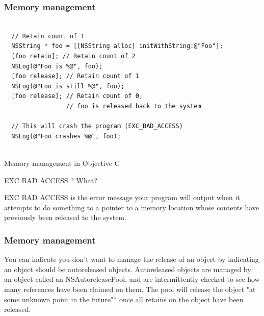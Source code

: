 \documentclass[10pt]{beamer}
\begin{document}
\begin{frame}[fragile]
  \frametitle{Memory management}
  \begin{listing}[H]
    \begin{verbatim}
  
  // Retain count of 1
  NSString * foo = [[NSString alloc] initWithString:@"Foo"];
  [foo retain]; // Retain count of 2
  NSLog(@"Foo is %@", foo);
  [foo release]; // Retain count of 1
  NSLog(@"Foo is still %@", foo);
  [foo release]; // Retain count of 0,
                 // foo is released back to the system
  
  // This will crash the program (EXC_BAD_ACCESS)
  NSLog(@"Foo crashes %@", foo);
              
  \end{verbatim}
    \caption{Memory management in Objective C}
    \label{listing:9}
  \end{listing}
\begin{block}{EXC BAD ACCESS ? What?}
  
  EXC BAD ACCESS is the error message your program will output when
  it attempts to do something to a pointer to a memory location
  whose contents have previously been released to the system.
              
  \end{block}

\end{frame}

\begin{frame}[fragile]
  \frametitle{Memory management}
  You can indicate you don't want to manage the release of an object by indicating an object should be autoreleased objects.  Autoreleased objects are managed by an object called an NSAutoreleasePool, and are intermittently checked to see how many references have been claimed on them.  The pool will release the object "at some unknown point in the future"* once all  retains on the object have been released.

\end{frame}
\end{document}
